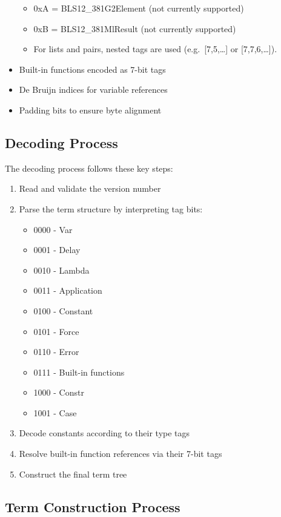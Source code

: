 \documentclass[../midgard.tex]{subfiles}
\begin{document}
\begin{itemize}
\begin{itemize}
      \item 0xA = BLS12\_381G2Element (not currently supported)
      \item 0xB = BLS12\_381MlResult (not currently supported)
      \item For lists and pairs, nested tags are used (e.g.\ [7,5,\dots] or [7,7,6,\dots]).
    \end{itemize}
    \item Built-in functions encoded as 7-bit tags
    \item De Bruijn indices for variable references
    \item Padding bits to ensure byte alignment
\end{itemize}

\subsection{Decoding Process}

The decoding process follows these key steps:

\begin{enumerate}
    \item Read and validate the version number
    \item Parse the term structure by interpreting tag bits:
        \begin{itemize}
            \item 0000 - Var
            \item 0001 - Delay
            \item 0010 - Lambda
            \item 0011 - Application
            \item 0100 - Constant
            \item 0101 - Force
            \item 0110 - Error
            \item 0111 - Built-in functions
            \item 1000 - Constr
            \item 1001 - Case
        \end{itemize}
    \item Decode constants according to their type tags
    \item Resolve built-in function references via their 7-bit tags
    \item Construct the final term tree
\end{enumerate}

\subsection{Term Construction Process}
\end{document}
